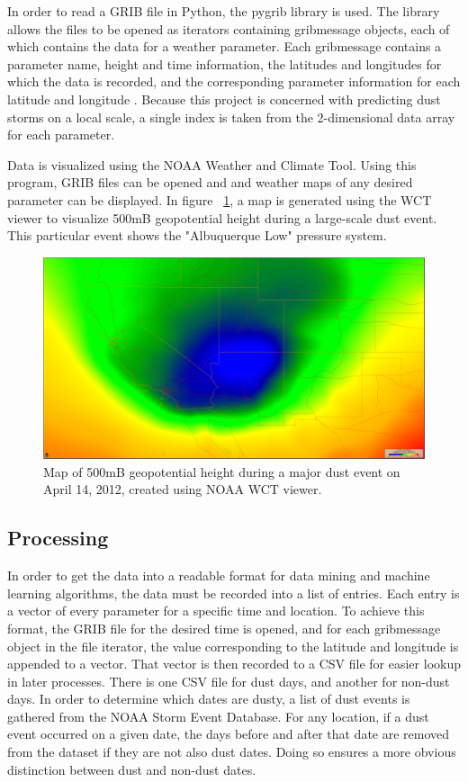 \documentclass{article}
\begin{document}
In order to read a GRIB file in Python, the pygrib library is used. The library allows the files to be opened as iterators containing gribmessage objects, each of which contains the data for a weather parameter. Each gribmessage contains a parameter name, height and time information, the latitudes and longitudes for which the data is recorded, and the corresponding parameter information for each latitude and longitude \cite{pgdoc}. Because this project is concerned with predicting dust storms on a local scale, a single index is taken from the 2-dimensional data array for each parameter.

Data is visualized using the NOAA Weather and Climate Tool. Using this program, GRIB files can be opened and and weather maps of any desired parameter can be displayed. In figure ~\ref{fig:map}, a map is generated using the WCT viewer to visualize 500mB geopotential height during a large-scale dust event. This particular event shows the "Albuquerque Low" pressure system.

\begin{figure}[H]
	\label{fig:map}
	\includegraphics[width=\textwidth]{images/abqlow.png}
	\caption{Map of 500mB geopotential height during a major dust event on April 14, 2012, created using NOAA WCT viewer.}
\end{figure}

\subsection{Processing}
In order to get the data into a readable format for data mining and machine learning algorithms, the data must be recorded into a list of entries. Each entry is a vector of every parameter for a specific time and location. To achieve this format, the GRIB file for the desired time is opened, and for each gribmessage object in the file iterator, the value corresponding to the latitude and longitude is appended to a vector. That vector is then recorded to a CSV file for easier lookup in later processes. There is one CSV file for dust days, and another for non-dust days. In order to determine which dates are dusty, a list of dust events is gathered from the NOAA Storm Event Database. For any location, if a dust event occurred on a given date, the days before and after that date are removed from the dataset if they are not also dust dates. Doing so ensures a more obvious distinction between dust and non-dust dates.
\end{document}
